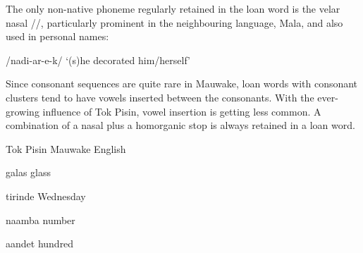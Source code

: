 The only non-native phoneme regularly retained in the loan word is the velar nasal /{\ng}/, particularly prominent in the neighbouring language, Mala, and also used in personal names:

/nadi{\ng-ar-e-k/}  `(s)he decorated him/herself'

Since consonant sequences are quite rare in Mauwake, loan words with consonant clusters tend to have vowels inserted between the consonants.  With the ever-growing influence of Tok Pisin, vowel insertion is getting less common.  A combination of a nasal plus a homorganic stop is always retained in a loan word.

Tok Pisin  Mauwake  English

  galas  glass

  tirinde  Wednesday

  naamba  number

  aandet  hundred

